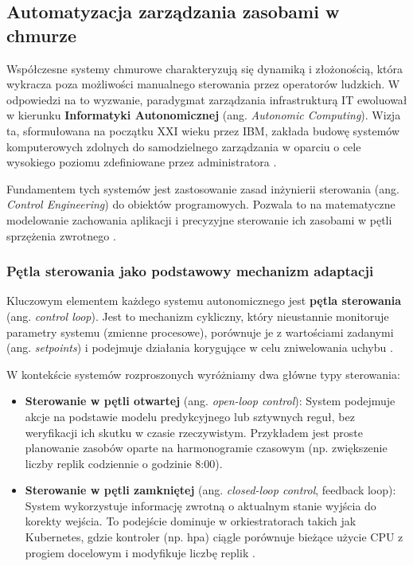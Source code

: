 \subsection{Automatyzacja zarządzania zasobami w chmurze}

Współczesne systemy chmurowe charakteryzują się dynamiką i złożonością, która wykracza poza możliwości manualnego 
sterowania przez operatorów ludzkich. W odpowiedzi na to wyzwanie, paradygmat zarządzania infrastrukturą IT 
ewoluował w kierunku \textbf{Informatyki Autonomicznej} (ang. \textit{Autonomic Computing}). Wizja ta, sformułowana 
na początku XXI wieku przez IBM, zakłada budowę systemów komputerowych zdolnych do samodzielnego zarządzania w oparciu 
o cele wysokiego poziomu zdefiniowane przez administratora \cite{kephart2003vision}.

Fundamentem tych systemów jest zastosowanie zasad inżynierii sterowania (ang. \textit{Control Engineering}) do 
obiektów programowych. Pozwala to na matematyczne modelowanie zachowania aplikacji i precyzyjne sterowanie ich 
zasobami w pętli sprzężenia zwrotnego \cite{hellerstein2004feedback}.

\subsubsection{Pętla sterowania jako podstawowy mechanizm adaptacji}

Kluczowym elementem każdego systemu autonomicznego jest \textbf{pętla sterowania} (ang. \textit{control loop}). 
Jest to mechanizm cykliczny, który nieustannie monitoruje parametry systemu (zmienne procesowe), porównuje je z 
wartościami zadanymi (ang. \textit{setpoints}) i podejmuje działania korygujące w celu zniwelowania uchybu 
\cite{brun2009engineering}.

W kontekście systemów rozproszonych wyróżniamy dwa główne typy sterowania:
\begin{itemize}
    \item \textbf{Sterowanie w pętli otwartej} (ang. \textit{open-loop control}): System podejmuje akcje na podstawie 
      modelu predykcyjnego lub sztywnych reguł, bez weryfikacji ich skutku w czasie rzeczywistym. Przykładem jest proste 
      planowanie zasobów oparte na harmonogramie czasowym (np. zwiększenie liczby replik codziennie o godzinie 8:00).
    \item \textbf{Sterowanie w pętli zamkniętej} (ang. \textit{closed-loop control}, feedback loop): System wykorzystuje 
      informację zwrotną o aktualnym stanie wyjścia do korekty wejścia. To podejście dominuje w orkiestratorach takich 
      jak Kubernetes, gdzie kontroler (np. \gls{hpa}) ciągle porównuje bieżące użycie CPU z progiem docelowym i modyfikuje 
      liczbę replik \cite{lorido2014review}.
\end{itemize}

